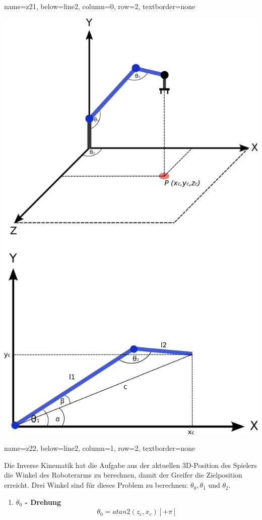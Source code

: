 \documentclass[portrait,a0paper]{baposter}
\begin{document}
\begin{poster}
    {
    name=z21,
    below=line2,
    column=0,
    row=2,
    textborder=none
    }
    {
        \includegraphics[width=\textwidth]{imgs/inverseKinematik.png}

 }
\headerbox{}
    {
    name=z22,
    below=line2,
    column=1,
    row=2,
    textborder=none
    }
    {
	Die Inverse Kinematik hat die Aufgabe aus der aktuellen 3D-Position des Spielers die Winkel des Roboterarms zu berechnen, damit der Greifer die Zielposition erreicht. Drei Winkel sind für dieses Problem zu berechnen: $\theta_0, \theta_1$ und $\theta_2$.
	\begin{enumerate}
	\item \textbf{$\theta_0$ - Drehung} 
\begin{eqnarray*}
	\theta_0 = atan2(z_c, x_c) \left[+ \pi \right]
	\end{eqnarray*}
	

\end{enumerate}}
\end{poster}
\end{document}
